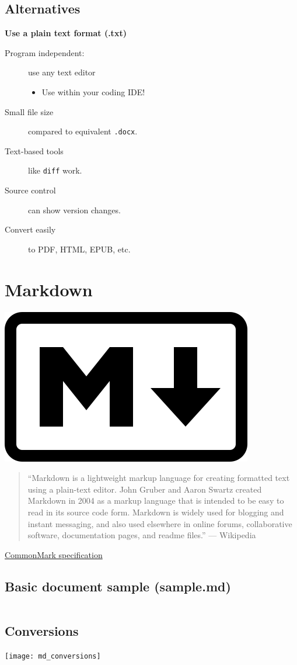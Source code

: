 \documentclass[slides]{pgnotes}
\begin{document}
\subsection{Alternatives}

\textbf{Use a plain text format (.txt)}
\begin{description}
\item[Program independent:] use any text editor
  \begin{itemize}
  \item Use within your coding IDE!
  \end{itemize}
\item[Small file size] compared to equivalent \texttt{.docx}.
\item[Text-based tools] like \texttt{diff} work.
\item[Source control] can show version changes. 
\item[Convert easily] to PDF, HTML, EPUB, etc.
\end{description}


\section{Markdown}

\begin{center}
\includegraphics[width=0.25\linewidth]{markdown_logo}
\end{center}

\begin{quotation}
  ``Markdown is a lightweight markup language for creating formatted text using a plain-text editor. John Gruber and Aaron Swartz created Markdown in 2004 as a markup language that is intended to be easy to read in its source code form. Markdown is widely used for blogging and instant messaging, and also used elsewhere in online forums, collaborative software, documentation pages, and readme files.'' --- Wikipedia
\end{quotation}

\href{https://spec.commonmark.org/0.30/}{CommonMark specification}

\subsection{Basic document sample (sample.md)}

\inputminted{markdown}{sample.md}

\subsection{Conversions}

\begin{center}
\texttt{[image: md\_conversions]}
\end{center}
\end{document}
